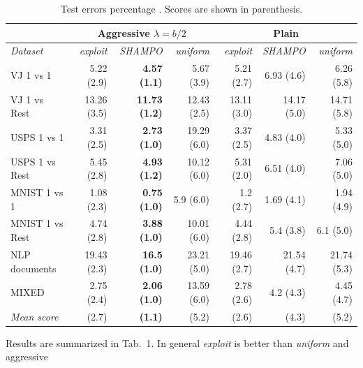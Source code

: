 \begin{table}[t]\label{tab:table1}
\begin{centering}
\caption{Test errors percentage . Scores are shown in parenthesis.}
{\small
\begin{tabular}{|l|r|r|r|r|r|r|}
\hline
                         & \multicolumn{3}{c|}{\textbf{Aggressive $\lambda=b/2$}}               & \multicolumn{3}{c|}{\textbf{Plain}}                 \\ \hline
\textit{Dataset}         & \textit{exploit} & \textit{SHAMPO}         & \textit{uniform} & \textit{exploit} & \textit{SHAMPO} & \textit{uniform} \\ \hline
{VJ 1 vs 1 }        & 5.22 (2.9)       & \textbf{4.57 (1.1)}   & 5.67 (3.9)       & 5.21 (2.7)       & 6.93 (4.6)    & 6.26 (5.8)       \\
\textrm{VJ 1 vs Rest}    & 13.26 (3.5)      & \textbf{11.73 (1.2)} & 12.43 (2.5)      & 13.11 (3.0)        & 14.17 (5.0)     & 14.71 (5.8)     \\
\textrm{USPS 1 vs 1}      & 3.31 (2.5)       & \textbf{2.73 (1.0)}     & 19.29 (6.0)        & 3.37 (2.5)       & 4.83 (4.0)      & 5.33 (5,0)         \\
\textrm{USPS 1 vs Rest}  & 5.45 (2.8)      & \textbf{4.93 (1.2)}  & 10.12 (6.0)        & 5.31 (2.0)         & 6.51 (4.0)      & 7.06 (5.0)         \\
\textrm{MNIST 1 vs 1}     & 1.08 (2.3)       & \textbf{0.75 (1.0)}     & 5.9 (6.0)         & 1.2 (2.7)       & 1.69 (4.1)      & 1.94 (4.9)     \\
\textrm{MNIST 1 vs Rest} & 4.74 (2.8)      & \textbf{3.88 (1.0)}     & 10.01 (6.0)       & 4.44 (2.8)      & 5.4 (3.8)    & 6.1 (5.0)          \\
\textrm{NLP documents} & 19.43 (2.3)     & \textbf{16.5 (1.0)}     & 23.21 (5.0)        & 19.46 (2.7)     & 21.54 (4.7)  & 21.74 (5.3)     \\
\textrm{MIXED}           & 2.75 (2.4)       & \textbf{2.06 (1.0)}     & 13.59 (6.0)        & 2.78 (2.6)       & 4.2 (4.3)     & 4.45 (4.7)       \\ \hline
\textit{Mean score}      & (2.7)           & \textbf{(1.1)}       & (5.2)           & (2.6)           & (4.3)        & (5.2)           \\ \hline
\end{tabular}
}
\end{centering}
\vspace{-0.5cm}
\end{table}
Results  are summarized in Tab.~1. In general {\em exploit} is better than {\em uniform} and aggressive 
